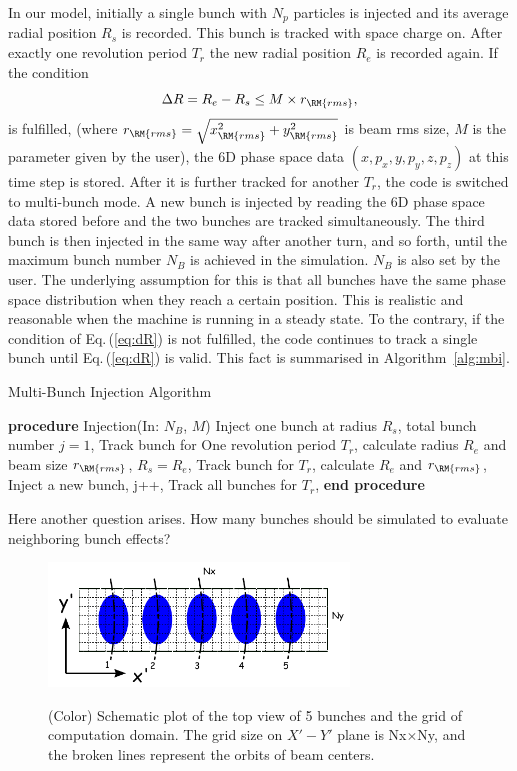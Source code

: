 \documentclass[aps,prstab,twocolumn,superscriptaddress,showpacs]{revtex4}
\begin{document}
In our model, initially a single bunch with $N_p$ particles is injected and its average radial position $R_s$ is recorded. This bunch is tracked with space charge on. 
After exactly one revolution period $T_{r}$ the new radial position $R_e$ is recorded again. If the condition
\begin{equation}\label{eq:dR}
  \Delta R = R_e-R_s \le M \times r_{\RM{rms}},
\end{equation}
is fulfilled, (where $r_{\RM{rms}}=\sqrt{x_{\RM{rms}}^{2}+y_{\RM{rms}}^2}$ is beam rms size, $M$ is the parameter given by the user), 
the 6D phase space data $(x, p_x, y, p_y, z, p_z)$ at this time step is stored. 
After it is further tracked for another $T_{r}$, the code is switched to multi-bunch mode. 
A new bunch is injected by reading the 6D phase space data stored before and the two bunches are tracked simultaneously.
The third bunch is then injected in the same way after another turn, and so forth, until the maximum bunch number $N_B$ is achieved in the simulation. $N_B$ is also set by the user.
The underlying assumption for this is that all bunches have the same phase space distribution when they reach a certain position.
This is realistic and reasonable when the machine is running in a steady state.  
To the contrary, if the condition of Eq.\,(\ref{eq:dR}) is not fulfilled,
the code continues to track a single bunch until Eq.\,(\ref{eq:dR}) is valid.   
This fact is summarised in Algorithm~\ref{alg:mbi}.

\begin{algorithm}
  \caption{Multi-Bunch Injection Algorithm} 
  \label{alg:mbi}
  \begin{algorithmic}[1]
    \STATE \textbf{procedure} Injection(In: $N_B$, $M$) 
    \STATE Inject one bunch at radius $R_s$, total bunch number $j=1$,
    \STATE Track bunch  for One revolution period $T_{r}$,
    \STATE calculate radius $R_e$ and beam size $r_{\RM{rms}}$,
    \STATE     $  R_s = R_e$,
    \STATE     Track bunch for $T_{r}$, calculate $R_e$ and $r_{\RM{rms}}$,
    \ENDWHILE
    \STATE Inject a new bunch, j++,
    \STATE Track all bunches for $T_{r}$,
    \ENDWHILE
    \STATE \textbf{end procedure}
  \end{algorithmic}
\end{algorithm}

Here another question arises. How many bunches should be simulated to evaluate neighboring bunch effects? 
  
\begin{figure}
    {\includegraphics[width=8cm]{figures/SM-MultiBunch.pdf}}
    \caption{(Color) Schematic plot of the top view of 5 bunches and the grid of computation domain. The grid size on $X'-Y'$ plane is Nx$\times$Ny, and the broken lines represent the orbits of beam centers. }
    \label{fig:MultiBunch}
\end{figure}
\end{document}
